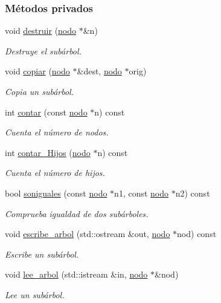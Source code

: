\subsubsection*{Métodos privados}
\begin{DoxyCompactItemize}
\item 
void \hyperlink{classArbolGeneral_abdc708bb7ad82b5ca172a24db9867c1e}{destruir} (\hyperlink{structArbolGeneral_1_1nodo}{nodo} $\ast$\&n)
\begin{DoxyCompactList}\small\item\em Destruye el subárbol. \end{DoxyCompactList}\item 
void \hyperlink{classArbolGeneral_a79f31cbba599abea7ab8b2f4ac7bef91}{copiar} (\hyperlink{structArbolGeneral_1_1nodo}{nodo} $\ast$\&dest, \hyperlink{structArbolGeneral_1_1nodo}{nodo} $\ast$orig)
\begin{DoxyCompactList}\small\item\em Copia un subárbol. \end{DoxyCompactList}\item 
int \hyperlink{classArbolGeneral_ac53afcc4c99179132bf593781d7c927f}{contar} (const \hyperlink{structArbolGeneral_1_1nodo}{nodo} $\ast$n) const 
\begin{DoxyCompactList}\small\item\em Cuenta el número de nodos. \end{DoxyCompactList}\item 
int \hyperlink{classArbolGeneral_a6a56e71e7f38894d58b9649a653d0948}{contar\-\_\-\-Hijos} (\hyperlink{structArbolGeneral_1_1nodo}{nodo} $\ast$n) const 
\begin{DoxyCompactList}\small\item\em Cuenta el número de hijos. \end{DoxyCompactList}\item 
bool \hyperlink{classArbolGeneral_a47e7ab8321b8ae2e11fc279caabf72de}{soniguales} (const \hyperlink{structArbolGeneral_1_1nodo}{nodo} $\ast$n1, const \hyperlink{structArbolGeneral_1_1nodo}{nodo} $\ast$n2) const 
\begin{DoxyCompactList}\small\item\em Comprueba igualdad de dos subárboles. \end{DoxyCompactList}\item 
void \hyperlink{classArbolGeneral_a444845d1484fa66fb65d84cbf2ac2efd}{escribe\-\_\-arbol} (std\-::ostream \&out, \hyperlink{structArbolGeneral_1_1nodo}{nodo} $\ast$nod) const 
\begin{DoxyCompactList}\small\item\em Escribe un subárbol. \end{DoxyCompactList}\item 
void \hyperlink{classArbolGeneral_a73927127a9f5c4e96eccb615ee09077a}{lee\-\_\-arbol} (std\-::istream \&in, \hyperlink{structArbolGeneral_1_1nodo}{nodo} $\ast$\&nod)
\begin{DoxyCompactList}\small\item\em Lee un subárbol. \end{DoxyCompactList}\end{DoxyCompactItemize}

